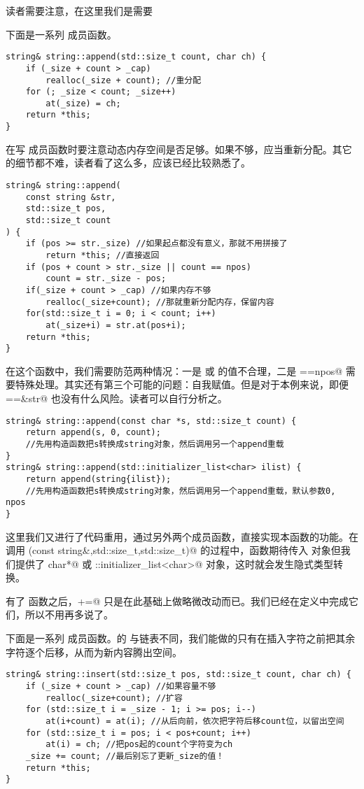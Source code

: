 读者需要注意，在这里我们是需要\par
下面是一系列 \lstinline@append@ 成员函数。
\begin{lstlisting}
string& string::append(std::size_t count, char ch) {
    if (_size + count > _cap)
        realloc(_size + count); //重分配
    for (; _size < count; _size++)
        at(_size) = ch;
    return *this;
}
\end{lstlisting}
在写 \lstinline@append@ 成员函数时要注意动态内存空间是否足够。如果不够，应当重新分配。其它的细节都不难，读者看了这么多，应该已经比较熟悉了。
\begin{lstlisting}
string& string::append(
    const string &str,
    std::size_t pos,
    std::size_t count
) {
    if (pos >= str._size) //如果起点都没有意义，那就不用拼接了
        return *this; //直接返回
    if (pos + count > str._size || count == npos)
        count = str._size - pos;
    if(_size + count > _cap) //如果内存不够
        realloc(_size+count); //那就重新分配内存，保留内容
    for(std::size_t i = 0; i < count; i++)
        at(_size+i) = str.at(pos+i);
    return *this;
}
\end{lstlisting}
在这个函数中，我们需要防范两种情况：一是 \lstinline@pos@ 或 \lstinline@count@ 的值不合理，二是 \lstinline@count==npos@ 需要特殊处理。其实还有第三个可能的问题：自我赋值。但是对于本例来说，即便 \lstinline@this==&str@ 也没有什么风险。读者可以自行分析之。
\begin{lstlisting}
string& string::append(const char *s, std::size_t count) {
    return append(s, 0, count);
    //先用构造函数把s转换成string对象，然后调用另一个append重载
}
string& string::append(std::initializer_list<char> ilist) {
    return append(string{ilist});
    //先用构造函数把s转换成string对象，然后调用另一个append重载，默认参数0, npos
}
\end{lstlisting}
这里我们又进行了代码重用，通过另外两个成员函数，直接实现本函数的功能。在调用 \lstinline@append(const string&,std::size_t,std::size_t)@ 的过程中，函数期待传入 \lstinline@string@ 对象但我们提供了 \lstinline@const char*@ 或 \lstinline@std::initializer_list<char>@ 对象，这时就会发生隐式类型转换。\par
有了 \lstinline@append@ 函数之后，\lstinline@operator+=@ 只是在此基础上做略微改动而已。我们已经在定义中完成它们，所以不用再多说了。\par
下面是一系列 \lstinline@insert@ 成员函数。\lstinline@string@ 的 \lstinline@insert@ 与链表不同，我们能做的只有在插入字符之前把其余字符逐个后移，从而为新内容腾出空间。
\begin{lstlisting}
string& string::insert(std::size_t pos, std::size_t count, char ch) {
    if (_size + count > _cap) //如果容量不够
        realloc(_size+count); //扩容
    for (std::size_t i = _size - 1; i >= pos; i--)
        at(i+count) = at(i); //从后向前，依次把字符后移count位，以留出空间
    for (std::size_t i = pos; i < pos+count; i++)
        at(i) = ch; //把pos起的count个字符变为ch
    _size += count; //最后别忘了更新_size的值！
    return *this;
}
\end{lstlisting}
